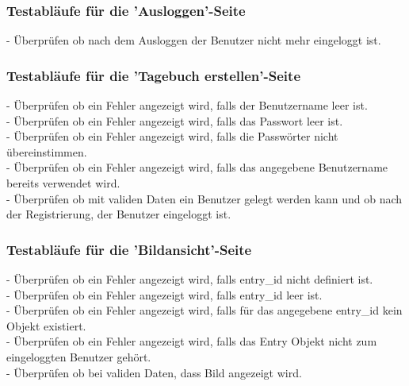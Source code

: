 \subsubsection*{Testabläufe für die 'Ausloggen'-Seite}
- Überprüfen ob nach dem Ausloggen der Benutzer nicht mehr eingeloggt ist.

\subsubsection*{Testabläufe für die 'Tagebuch erstellen'-Seite}
- Überprüfen ob ein Fehler angezeigt wird, falls der Benutzername leer ist.\\
- Überprüfen ob ein Fehler angezeigt wird, falls das Passwort leer ist.\\
- Überprüfen ob ein Fehler angezeigt wird, falls die Passwörter nicht übereinstimmen.\\
- Überprüfen ob ein Fehler angezeigt wird, falls das angegebene Benutzername bereits verwendet wird.\\
- Überprüfen ob mit validen Daten ein Benutzer gelegt werden kann und ob nach der Registrierung, der Benutzer eingeloggt ist.

\subsubsection*{Testabläufe für die 'Bildansicht'-Seite}
- Überprüfen ob ein Fehler angezeigt wird, falls entry\_id nicht definiert ist.\\
- Überprüfen ob ein Fehler angezeigt wird, falls entry\_id leer ist.\\
- Überprüfen ob ein Fehler angezeigt wird, falls für das angegebene entry\_id kein Objekt existiert.\\
- Überprüfen ob ein Fehler angezeigt wird, falls das Entry Objekt nicht zum eingeloggten Benutzer gehört.\\
- Überprüfen ob bei validen Daten, dass Bild angezeigt wird.
